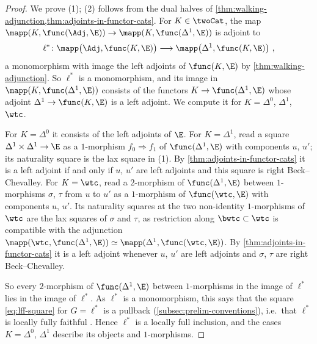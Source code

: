 \begin{proof}
We prove (1); (2) follows from the dual halves of \cref{thm:walking-adjunction,thm:adjoints-in-functor-cats}.
For $K \in \twoCat$, the map $\mapp(K,\func(\Adj,\E)) \to \mapp(K,\func(\Delta^{1},\E))$ is adjoint to
\[
\ell^{*}\colon \mapp\bigl(\Adj,\func(K,\E)\bigr) \longrightarrow \mapp\bigl(\Delta^{1},\func(K,\E)\bigr) \ ,
\]
a monomorphism with image the left adjoints of $\func(K,\E)$ by \cref{thm:walking-adjunction}. So $\ell^{*}$ is a monomorphism, and its image in $\mapp(K,\func(\Delta^{1},\E))$ consists of the functors $K \to \func(\Delta^{1},\E)$ whose adjoint $\Delta^{1} \to \func(K,\E)$ is a left adjoint. We compute it for $K = \Delta^{0}$, $\Delta^{1}$, $\wtc$.

For $K = \Delta^{0}$ it consists of the left adjoints of $\E$.
For $K = \Delta^{1}$, read a square $\Delta^{1} \times \Delta^{1} \to \E$ as a $1$-morphism $f_{0} \Rightarrow f_{1}$ of $\func(\Delta^{1},\E)$ with components $u$, $u'$; its naturality square is the lax square in (1). By \cref{thm:adjoints-in-functor-cats} it is a left adjoint if and only if $u$, $u'$ are left adjoints and this square is right Beck--Chevalley.
For $K = \wtc$, read a $2$-morphism of $\func(\Delta^{1},\E)$ between $1$-morphisms $\sigma$, $\tau$ from $u$ to $u'$ as a $1$-morphism of $\func(\wtc,\E)$ with components $u$, $u'$. Its naturality squares at the two non-identity $1$-morphisms of $\wtc$ are the lax squares of $\sigma$ and $\tau$, as restriction along $\bwtc \subset \wtc$ is compatible with the adjunction $\mapp(\wtc,\func(\Delta^{1},\E)) \simeq \mapp(\Delta^{1},\func(\wtc,\E))$. By \cref{thm:adjoints-in-functor-cats} it is a left adjoint whenever $u$, $u'$ are left adjoints and $\sigma$, $\tau$ are right Beck--Chevalley.

So every $2$-morphism of $\func(\Delta^{1},\E)$ between $1$-morphisms in the image of $\ell^{*}$ lies in the image of $\ell^{*}$. As $\ell^{*}$ is a monomorphism, this says that the square \eqref{eq:lff-square} for $G = \ell^{*}$ is a pullback (\cref{subsec:prelim-conventions}), i.e.\ that $\ell^{*}$ is locally fully faithful \cite[Prop.~2.6.5]{abellangagnahaugseng2024straightening}. Hence $\ell^{*}$ is a locally full inclusion, and the cases $K = \Delta^{0}$, $\Delta^{1}$ describe its objects and $1$-morphisms.
\end{proof}

